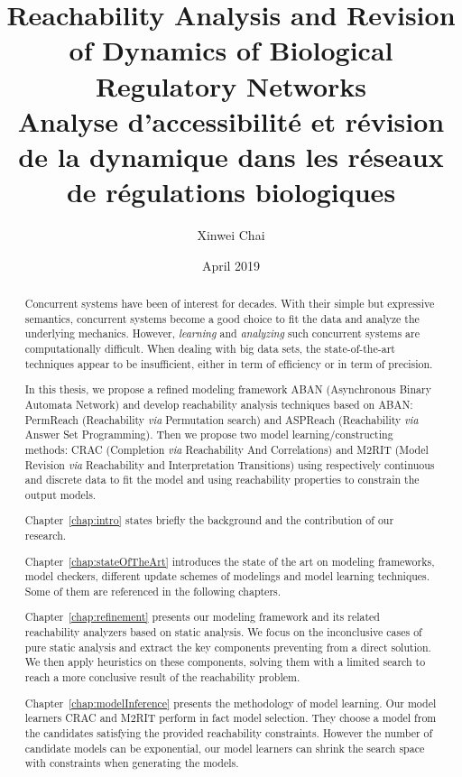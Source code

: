 \documentclass[11pt,twoside,openright]{report}
\title{Reachability Analysis and Revision of Dynamics of Biological Regulatory Networks
\\
\vspace{0.5cm}
\large Analyse d'accessibilit\'e et r\'evision de la dynamique dans les r\'eseaux de r\'egulations biologiques
}
\date{April 2019}
\author{Xinwei Chai}
\theoremstyle{definition}
\begin{document}
{}
\setcounter{page}{1}




\tableofcontents
\listoffigures
\listoftables

\begin{abstract}
Concurrent systems have been of interest for decades.
With their simple but expressive semantics, concurrent systems become a good choice to fit the data and analyze the underlying mechanics.
However, \textit{learning} and \textit{analyzing} such concurrent systems are computationally difficult.
When dealing with big data sets, the state-of-the-art techniques appear to be insufficient, either in term of efficiency or in term of precision.

In this thesis, we propose a refined modeling framework ABAN (Asynchronous Binary Automata Network) and develop reachability analysis techniques based on ABAN: PermReach (Reachability \textit{via} Permutation search) and ASPReach (Reachability \textit{via} Answer Set Programming).
Then we propose two model learning/constructing methods: CRAC (Completion \textit{via} Reachability And Correlations) and M2RIT (Model Revision \textit{via} Reachability and Interpretation Transitions) using respectively continuous and discrete data to fit the model and using reachability properties to constrain the output models.

Chapter~\ref{chap:intro} states briefly the background and the contribution of our research.

Chapter~\ref{chap:stateOfTheArt} introduces the state of the art on modeling frameworks, model checkers, different update schemes of modelings and model learning techniques.
Some of them are referenced in the following chapters.

Chapter~\ref{chap:refinement} presents our modeling framework and its related reachability analyzers based on static analysis.
We focus on the inconclusive cases of pure static analysis and extract the key components preventing from a direct solution.
We then apply heuristics on these components, solving them with a limited search to reach a more conclusive result of the reachability problem.

Chapter~\ref{chap:modelInference} presents the methodology of model learning.
Our model learners CRAC and M2RIT perform in fact model selection. 
They choose a model from the candidates satisfying the provided reachability constraints.
However the number of candidate models can be exponential, our model learners can shrink the search space with constraints when generating the models.


\end{abstract}
\end{document}
